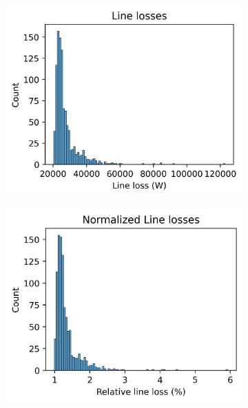 \begin{figure}[H]
\begin{subfigure}{.33\textwidth}
      \caption{}
      \label{fig:result:suburban:histograms:max_trafo}
    \end{subfigure}%
    \begin{subfigure}{.33\textwidth}
      \centering
      \includegraphics[width=\linewidth]{img/switchstate_exploring/swiss_suburb/histograms/line_loss.png}
      \caption{}
      \label{fig:result:suburban:histograms:line_loss}
    \end{subfigure}%
    \begin{subfigure}{.33\textwidth}
      \centering
      \includegraphics[width=\linewidth]{img/switchstate_exploring/swiss_suburb/histograms/line_loss_relative.png}

\end{subfigure}
\end{figure}
